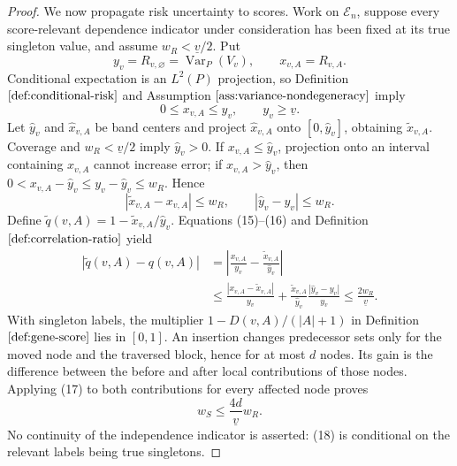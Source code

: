 \documentclass{article}
\begin{document}
\begin{proof}
We now propagate risk uncertainty to scores. Work on \(\mathcal E_n\), suppose every score-relevant dependence indicator under consideration has been fixed at its true singleton value, and assume \(w_R<\underline v/2\). Put
\[
 y_v=R_{v,\varnothing}=\operatorname{Var}_P(V_v),
 \qquad x_{v,A}=R_{v,A}.
\]
Conditional expectation is an \(L^2(P)\) projection, so Definition \(\ref{def:conditional-risk}\) and Assumption \(\ref{ass:variance-nondegeneracy}\) imply
\[
 0\le x_{v,A}\le y_v,
 \qquad y_v\ge\underline v. \tag{15}
\]
Let \(\widehat y_v\) and \(\widehat x_{v,A}\) be band centers and project \(\widehat x_{v,A}\) onto \([0,\widehat y_v]\), obtaining \(\widetilde x_{v,A}\). Coverage and \(w_R<\underline v/2\) imply \(\widehat y_v>0\). If \(x_{v,A}\le\widehat y_v\), projection onto an interval containing \(x_{v,A}\) cannot increase error; if \(x_{v,A}>\widehat y_v\), then \(0<x_{v,A}-\widehat y_v\le y_v-\widehat y_v\le w_R\). Hence
\[
 |\widetilde x_{v,A}-x_{v,A}|\le w_R,
 \qquad |\widehat y_v-y_v|\le w_R. \tag{16}
\]
Define \(\widetilde q(v,A)=1-\widetilde x_{v,A}/\widehat y_v\). Equations (15)--(16) and Definition \(\ref{def:correlation-ratio}\) yield
\[
\begin{aligned}
 |\widetilde q(v,A)-q(v,A)|
 &=\left|\frac{x_{v,A}}{y_v}
       -\frac{\widetilde x_{v,A}}{\widehat y_v}\right|\\
 &\le\frac{|x_{v,A}-\widetilde x_{v,A}|}{y_v}
 +\frac{\widetilde x_{v,A}}{\widehat y_v}
  \frac{|\widehat y_v-y_v|}{y_v}
 \le\frac{2w_R}{\underline v}. \tag{17}
\end{aligned}
\]
With singleton labels, the multiplier \(1-D(v,A)/(|A|+1)\) in Definition \(\ref{def:gene-score}\) lies in \([0,1]\). An insertion changes predecessor sets only for the moved node and the traversed block, hence for at most \(d\) nodes. Its gain is the difference between the before and after local contributions of those nodes. Applying (17) to both contributions for every affected node proves
\[
 w_S\le\frac{4d}{\underline v}w_R. \tag{18}
\]
No continuity of the independence indicator is asserted: (18) is conditional on the relevant labels being true singletons.


\end{proof}
\end{document}
